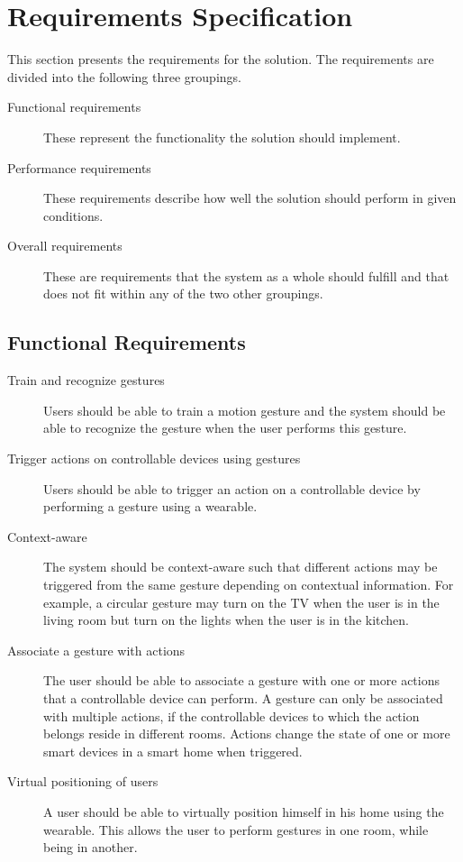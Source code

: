 \section{Requirements Specification}
\label{sec:requirements-specification}

This section presents the requirements for the solution. The requirements are divided into the following three groupings.

\begin{description}
\item[Functional requirements] These represent the functionality the solution should implement.
\item[Performance requirements] These requirements describe how well the solution should perform in given conditions.
\item[Overall requirements] These are requirements that the system as a whole should fulfill and that does not fit within any of the two other groupings.
\end{description}

\subsection{Functional Requirements}

\begin{description}
\item[Train and recognize gestures] Users should be able to train a motion gesture and the system should be able to recognize the gesture when the user performs this gesture.
\item[Trigger actions on controllable devices using gestures] Users should be able to trigger an action on a controllable device by performing a gesture using a wearable.
\item[Context-aware] The system should be context-aware such that different actions may be triggered from the same gesture depending on contextual information. For example, a circular gesture may turn on the TV when the user is in the living room but turn on the lights when the user is in the kitchen.
\item[Associate a gesture with actions] The user should be able to associate a gesture with one or more actions that a controllable device can perform. A gesture can only be associated with multiple actions, if the controllable devices to which the action belongs reside in different rooms. Actions change the state of one or more smart devices in a smart home when triggered.
\item[Virtual positioning of users] A user should be able to virtually position himself in his home using the wearable. This allows the user to perform gestures in one room, while being in another.
\end{description}


